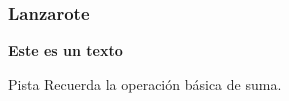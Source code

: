 \documentclass{beamer}
\begin{document}
	
	\begin{frame}
		\frametitle{Lanzarote}
		
		\textbf{Este es un texto}
		
		\begin{block}{Pista}
			Recuerda la operación básica de suma.
		\end{block}
		
	\end{frame}
	
\end{document}
